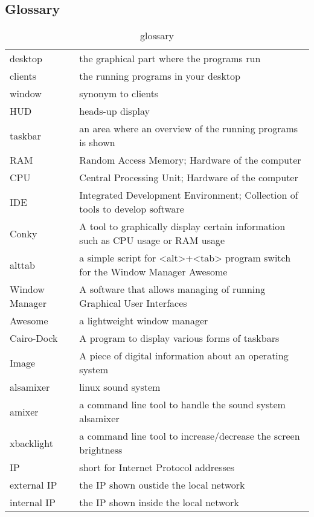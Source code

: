 		\subsection{Glossary}
		\begin{table}[H]
			\centering
			\tableformat
			\begin{tabular}{l|l}
			desktop & the graphical part where the programs run\\
			clients & the running programs in your desktop\\
			window & synonym to clients\\
			HUD & heads-up display\\
			taskbar & an area where an overview of the running programs is shown\\
			RAM & Random Access Memory; Hardware of the computer\\
			CPU & Central Processing Unit; Hardware of the computer\\
			IDE & Integrated Development Environment; Collection of tools to develop software\\
			Conky & A tool to graphically display certain information such as CPU usage or RAM usage\\
			alttab & a simple script for <alt>+<tab> program switch for the Window Manager Awesome\\
			Window Manager & A software that allows managing of running Graphical User Interfaces\\
			Awesome & a lightweight window manager\\
			Cairo-Dock & A program to display various forms of taskbars\\
			Image & A piece of digital information about an operating system\\
			alsamixer & linux sound system\\
			amixer & a command line tool to handle the sound system alsamixer\\
			xbacklight & a command line tool to increase/decrease the screen brightness\\
			IP & short for Internet Protocol addresses\\
			external IP & the IP shown oustide the local network\\
			internal IP & the IP shown inside the local network\\
			\end{tabular}
			\label{glossary}
			\caption{glossary}
		\end{table}